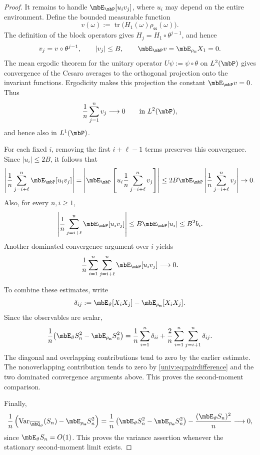 \documentclass[10pt,a4paper]{amsart}
\numberwithin{equation}{section}   %
\theoremstyle{plain}   %
\theoremstyle{plain}   %
\theoremstyle{examplestyle}
\DeclareMathOperator{\pr}{\mbP}           %
\newcommand{\s}{\rho_{\mathsf{ss}}}     %
\DeclareMathOperator{\str}{tr} %
\begin{document}
\begin{proof}
    It remains to handle $\mbE_{\pr}[u_i v_j]$, where $u_i$ may depend on the entire environment.
    Define the bounded measurable function
    \[
        v(\omega)
        :=
        \str\bigl(H_1(\omega)\s(\omega)\bigr).
    \]
    The definition of the block operators gives $H_j=H_1\circ\theta^{j-1}$, and hence
    \[
        v_j=v\circ\theta^{j-1},
        \qquad
        |v_j|\le B,
        \qquad
        \mbE_{\pr}v=\mbE_{\s}X_1=0.
    \]
    The mean ergodic theorem for the unitary operator $U\psi:=\psi\circ\theta$ on $L^2(\pr)$ gives convergence of the Cesaro averages to the orthogonal projection onto the invariant functions.
    Ergodicity makes this projection the constant $\mbE_{\pr}v=0$. 
    Thus
    \[
        \frac1n\sum_{j=1}^n v_j
        \longrightarrow0
        \qquad\text{in }L^2(\pr),
    \]
    and hence also in $L^1(\pr)$.

    For each fixed $i$, removing the first $i+\ell-1$ terms preserves this convergence.
    Since $|u_i|\le2B$, it follows that
    \[
            \left|
                \frac1n
                \sum_{j=i+\ell}^n
                    \mbE_{\pr}[u_i v_j]
            \right|
            =
            \left|
                \mbE_{\pr}\left[
                    u_i\frac1n\sum_{j=i+\ell}^n v_j
                \right]
            \right|
            \le
            2B\mbE_{\pr}
                \left|
                    \frac1n\sum_{j=i+\ell}^n v_j
                \right|
            \to0.
    \]
    Also, for every $n,i\ge1$,
    \[
        \left|
            \frac1n
            \sum_{j=i+\ell}^n\mbE_{\pr}[u_i v_j]
        \right|
        \le
        B\mbE_{\pr}|u_i|
        \le B^2b_i.
    \]
    Another dominated convergence argument over $i$ yields
    \[
        \frac1n
        \sum_{i=1}^n\sum_{j=i+\ell}^n
            \mbE_{\pr}[u_i v_j]
        \longrightarrow0.
    \]

    To combine these estimates, write
    \[
        \delta_{ij}
        :=
        \mbE_\vartheta[X_iX_j]
        -
        \mbE_{\s}[X_iX_j].
    \]
    Since the observables are scalar,
    \[
        \frac1n
        \bigl(
            \mbE_\vartheta S_n^2-\mbE_{\s}S_n^2
        \bigr)
        =
        \frac1n\sum_{i=1}^n\delta_{ii}
        +
        \frac2n\sum_{i=1}^n\sum_{j=i+1}^n\delta_{ij}.
    \]
    The diagonal and overlapping contributions tend to zero by the earlier estimate. 
    The nonoverlapping contribution tends to zero by \eqref{univ:eq:pairdifference} and the two dominated convergence arguments above.
    This proves the second-moment comparison.
    
    Finally,
    \[
            \frac1n
            \left(
                \operatorname{Var}_{\overline\mbQ_\vartheta}(S_n)
                -
                \mbE_{\s}S_n^2
            \right)
            =
            \frac1n
            \left(
                \mbE_\vartheta S_n^2-\mbE_{\s}S_n^2
            \right)
            -
            \frac{(\mbE_\vartheta S_n)^2}{n}
            \longrightarrow0,
    \]
    since $\mbE_\vartheta S_n=O(1)$.
    This proves the variance assertion whenever the stationary second-moment limit exists.
\end{proof}
\end{document}

